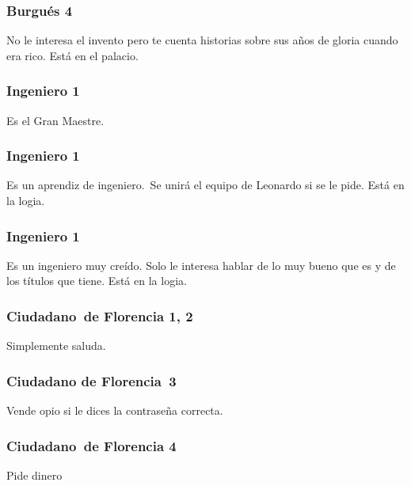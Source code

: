 \subsubsection[Burgu\'es 4]{ Burgu\'es 4}
\hypertarget{Toc484614241}{}{
No le interesa el invento pero te cuenta historias sobre sus a\~nos de gloria cuando era rico. Est\'a en el palacio.}

\subsubsection[Ingeniero 1]{ Ingeniero 1}
\hypertarget{Toc484614242}{}{
Es el Gran Maestre.\ }

\subsubsection[Ingeniero 1]{ Ingeniero 1}
\hypertarget{Toc484614243}{}{
Es un aprendiz de ingeniero.\ Se unir\'a el equipo de Leonardo si se le pide. Est\'a en la logia.}

\subsubsection[Ingeniero 1]{ Ingeniero 1}
\hypertarget{Toc484614244}{}{
Es un ingeniero muy cre\'ido. Solo le interesa hablar de lo muy bueno que es y de los t\'itulos que tiene. Est\'a en la
logia.}

\subsubsection[Ciudadano\ de Florencia 1, 2]{ Ciudadano\ de Florencia 1, 2}
\hypertarget{Toc484614245}{}{
Simplemente saluda.\ }

\subsubsection[Ciudadano de Florencia\ 3]{ Ciudadano de Florencia\ 3}
\hypertarget{Toc484614246}{}{
Vende opio si le dices la contrase\~na correcta.}

\subsubsection[Ciudadano\ de Florencia 4]{ Ciudadano\ de Florencia 4}
\hypertarget{Toc484614247}{}{
Pide dinero}

